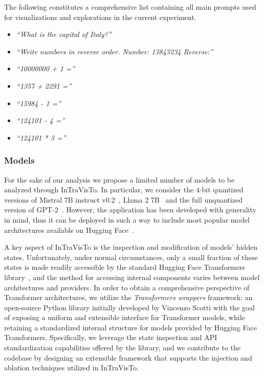 The following constitutes a comprehensive list containing all main prompts used for visualizations and explorations in the current experiment.

\begin{multicols}{2}
    \begin{itemize}
        \item \emph{``What is the capital of Italy?''}
        \item \emph{``Write numbers in reverse order. Number: 13843234 Reverse:''}
        \item \emph{``10000000 + 1 =''}
        \item \emph{``1357 + 2291 =''}
        \item \emph{``15984 - 1 =''}
        \item \emph{``124101 - 4 =''}
        \item \emph{``124101 * 3 =''}
    \end{itemize}
\end{multicols}

\subsubsection{Models}

For the sake of our analysis we propose a limited number of models to be analyzed through InTraVisTo.
In particular, we consider the $4$-bit quantized versions of Mistral 7B instruct v0.2~\cite{jiang2023}, Llama 2 7B~\cite{touvron2023} and the full unquantized version of GPT-2~\cite{radford2019}.
However, the application has been developed with generality in mind, thus it can be deployed in such a way to include most popular model architectures available on Hugging Face~\cite{wolf2020}.

A key aspect of InTraVisTo is the inspection and modification of models' hidden states.
Unfortunately, under normal circumstances, only a small fraction of these states is made readily accessible by the standard Hugging Face Transformers library~\cite{wolf2020}, and the method for accessing internal components varies between model architectures and providers.
In order to obtain a comprehensive perspective of Transformer architectures, we utilize the \emph{Transformers wrappers} framework\footnotemark: an open-source Python library initially developed by Vincenzo Scotti with the goal of exposing a uniform and extensible interface for Transformer models, while retaining a standardized internal structure for models provided by Hugging Face Transformers.
Specifically, we leverage the state inspection and API standardization capabilities offered by the library, and we contribute to the codebase by designing an extensible framework that supports the injection and ablation techniques utilized in InTraVisTo.

